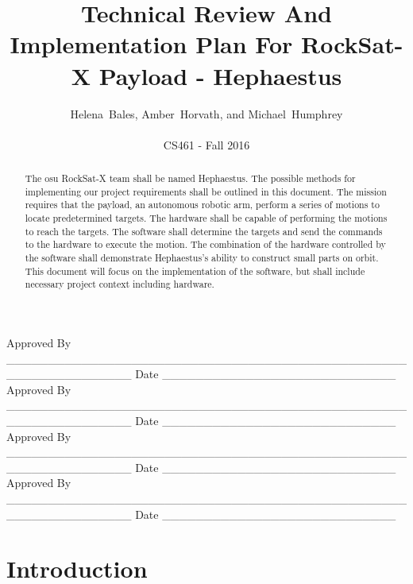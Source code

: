 \documentclass[letterpaper,10pt]{article}
\title{Technical Review And Implementation Plan For RockSat-X Payload - Hephaestus}
\author{Helena~Bales, Amber~Horvath, and Michael~Humphrey\\ \\ CS461 - Fall 2016}
\newenvironment{bottompar}{\par\vspace*{\fill}}{\clearpage}
\begin{document}
\maketitle

\begin{abstract}
The \gls{osu} RockSat-X team shall be named Hephaestus.
The possible methods for implementing our project requirements shall be outlined in this document.
The mission requires that the \gls{payload}, an autonomous robotic arm, perform a series of motions to locate predetermined targets.
The hardware shall be capable of performing the motions to reach the targets.
The software shall determine the targets and send the commands to the hardware to execute the motion.
The combination of the hardware controlled by the software shall demonstrate Hephaestus's ability to construct small parts on orbit.
This document will focus on the implementation of the software, but shall include necessary project context including hardware.
\end{abstract}

\begin{bottompar}
Approved By
\_\_\_\_\_\_\_\_\_\_\_\_\_\_\_\_\_\_\_\_\_\_\_\_\_\_\_\_\_\_\_\_\_\_\_\_\_\_\_\_\_\_\_\_\_\_\_\_\_\_\_\_\_\_\_\_\_\_\_\_\_\_\_
Date \_\_\_\_\_\_\_\_\_\_\_\_\_\_\_\_\_\_\_\_\_\_\_\_\_\_\_\_ \\


Approved By
\_\_\_\_\_\_\_\_\_\_\_\_\_\_\_\_\_\_\_\_\_\_\_\_\_\_\_\_\_\_\_\_\_\_\_\_\_\_\_\_\_\_\_\_\_\_\_\_\_\_\_\_\_\_\_\_\_\_\_\_\_\_\_
Date \_\_\_\_\_\_\_\_\_\_\_\_\_\_\_\_\_\_\_\_\_\_\_\_\_\_\_\_ \\


Approved By
\_\_\_\_\_\_\_\_\_\_\_\_\_\_\_\_\_\_\_\_\_\_\_\_\_\_\_\_\_\_\_\_\_\_\_\_\_\_\_\_\_\_\_\_\_\_\_\_\_\_\_\_\_\_\_\_\_\_\_\_\_\_\_
Date \_\_\_\_\_\_\_\_\_\_\_\_\_\_\_\_\_\_\_\_\_\_\_\_\_\_\_\_ \\


Approved By
\_\_\_\_\_\_\_\_\_\_\_\_\_\_\_\_\_\_\_\_\_\_\_\_\_\_\_\_\_\_\_\_\_\_\_\_\_\_\_\_\_\_\_\_\_\_\_\_\_\_\_\_\_\_\_\_\_\_\_\_\_\_\_
Date \_\_\_\_\_\_\_\_\_\_\_\_\_\_\_\_\_\_\_\_\_\_\_\_\_\_\_\_ \\
\end{bottompar}

\clearpage
\tableofcontents
\clearpage

\section{Introduction}
\end{document}
